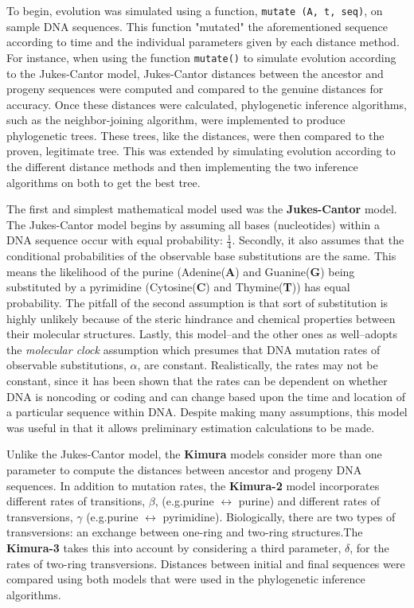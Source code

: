 \documentclass[11pt]{article}
\theoremstyle{definition}\newtheorem*{problem}{Problem}
\theoremstyle{remark}\newtheorem{claim}{Claim}
\theoremstyle{remark}\newtheorem*{sol}{Solution}
\begin{document}
\par To begin, evolution was simulated using a function, \texttt{mutate (A, t, seq)}, on sample DNA sequences. This function "mutated" the aforementioned sequence according to time and the individual parameters given by each distance method. For instance, when using the function \texttt{mutate()} to simulate evolution according to the Jukes-Cantor model, Jukes-Cantor distances between the ancestor and progeny sequences were computed and compared to the genuine distances for accuracy. Once these distances were calculated, phylogenetic inference algorithms, such as the neighbor-joining algorithm, were implemented to produce phylogenetic trees. These trees, like the distances, were then compared to the proven, legitimate tree. This was extended by simulating evolution according to the different distance methods and then implementing the two inference algorithms on both to get the best tree.

\par The first and simplest mathematical model used was the \textbf{Jukes-Cantor} model. The Jukes-Cantor model begins by assuming all bases (nucleotides) within a DNA sequence occur with equal probability: \(\frac{1}{4}\). Secondly, it also assumes that the conditional probabilities of the observable base substitutions are the same. This means the likelihood of the purine (Adenine(\textbf{A}) and Guanine(\textbf{G}) being substituted by a pyrimidine (Cytosine(\textbf{C}) and Thymine(\textbf{T})) has equal probability. The pitfall of the second assumption is that sort of substitution is highly unlikely because of the steric hindrance and chemical properties between their molecular structures. Lastly, this model--and the other ones as well--adopts the \textit{molecular clock} assumption which presumes that DNA mutation rates of observable substitutions, $\alpha$, are constant. Realistically, the rates may not be constant, since it has been shown that the rates can be dependent on whether DNA is noncoding or coding and can change based upon the time and location of a particular sequence within DNA. Despite making many assumptions, this model was useful in that it allows preliminary estimation calculations to be made. 

\par Unlike the Jukes-Cantor model, the \textbf{Kimura} models consider more than one parameter to compute the distances between ancestor and progeny DNA sequences. In addition to mutation rates, the \textbf{Kimura-2} model incorporates different rates of transitions, $\beta$, (e.g.purine $\longleftrightarrow$ purine) and different rates of transversions, $\gamma$ (e.g.purine $\longleftrightarrow$ pyrimidine). Biologically, there are two types of transversions: an exchange between one-ring and two-ring structures.The \textbf{Kimura-3} takes this into account by considering a third parameter, $\delta$, for the rates of two-ring transversions. Distances between initial and final sequences were compared using both models that were used in the phylogenetic inference algorithms.
\end{document}

